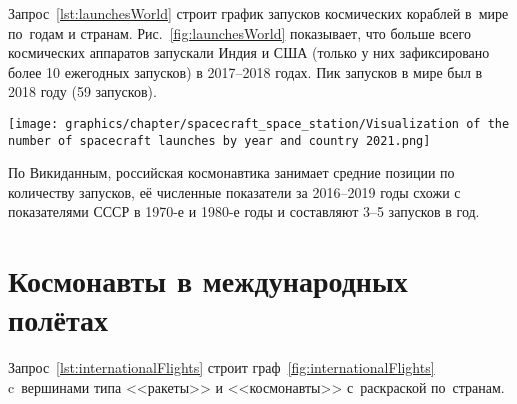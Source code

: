 Запрос~\ref{lst:launchesWorld} строит график 
запусков космических кораблей в~мире по~годам и странам. 
Рис.~\ref{fig:launchesWorld} показывает, что больше всего космических аппаратов 
запускали Индия и США 
(только у них зафиксировано более 10 ежегодных запусков) в 2017--2018 годах. 
Пик запусков в мире был в 2018 году (59 запусков). 




\newpage

\begin{figure*}[h!]
  \texttt{[image: graphics/chapter/spacecraft\_space\_station/Visualization of the number of spacecraft launches by year and country 2021.png]}
  \caption[График запусков космических кораблей в мире по годам и странам, 2021 год.]{Диаграмма ежегодного суммарного количества запусков космических кораблей по всем странам}
  \label{fig:launchesWorld}%
\end{figure*}


\newpage

По Викиданным, российская космонавтика занимает средние позиции по количеству запусков, 
её численные показатели за 2016--2019 годы схожи с показателями СССР в 1970-е и 1980-е годы 
и составляют 3--5 запусков в год.



\section{Космонавты в международных полётах}

Запрос~\ref{lst:internationalFlights} строит граф~\ref{fig:internationalFlights} 
c~вершинами типа <<ракеты>> и <<космонавты>> с~раскраской по~странам.


